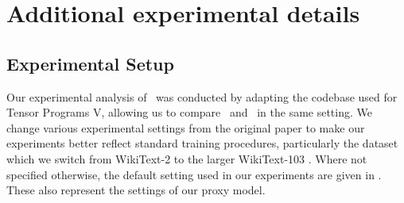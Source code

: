 \section{Additional experimental details} \label{app:additional_experimental_results}

\subsection{Experimental Setup} \label{app:additional_experimental_results:experimental_details}

Our experimental analysis of \umup\ was conducted by adapting the codebase used for Tensor Programs V, allowing us to compare \mup\ and \umup\ in the same setting. We change various experimental settings from the original paper to make our experiments better reflect standard training procedures, particularly the dataset which we switch from WikiText-2 to the larger WikiText-103 \citep{WikiText103}. Where not specified otherwise, the default setting used in our experiments are given in . These also represent the settings of our proxy model.

